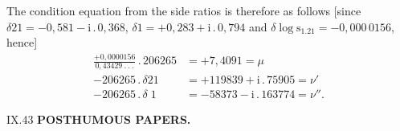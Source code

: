 The condition equation from the side ratios is therefore as follows [since \(\delta21=-0{,}581-\mathrm{i}\,.\,0{,}368\), \(\delta1=+0{,}283+\mathrm{i}\,.\,0{,}794\) and \(\delta\log\mathrm{s}_{1.21}=-0{,}000\,0156\), hence]
\[
\begin{aligned}
\frac{+0{,}0000156}{0{,}43429\ .\ .\ .}\,.\,206265&=+7{,}4091=\mu\\[4pt]
-206265\,.\,\delta21&=+119839+\mathrm{i}\,.\,75905=\nu'\\[4pt]
-206265\,.\,\delta\;1&=-58373-\mathrm{i}\,.\,163774=\nu''.
\end{aligned}
\]
\endgroup
\par\vfill\noindent\small IX.\hfill43\normalsize
\clearpage
{}\hfill\textbf{POSTHUMOUS PAPERS.}\par\medskip
\begingroup
\small\setlength{\tabcolsep}{5pt}\renewcommand{\arraystretch}{1.18}
